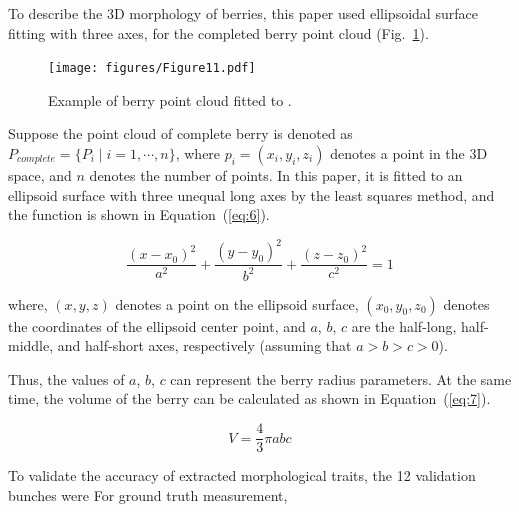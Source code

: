 \documentclass[12pt]{article}
\begin{document}
To describe the 3D morphology of berries, this paper used ellipsoidal surface fitting with three axes, for the completed berry point cloud (Fig.~\ref{fig:raw16}).

\begin{figure}[hbt!]
    \centering
    \texttt{[image: figures/Figure11.pdf]}
    \caption{Example of berry point cloud fitted to .}
    \label{fig:raw16}
\end{figure}


Suppose the point cloud of  complete berry is denoted as $P_{complete}=\{P_i \mid i=1, \cdots,n\}$, where $p_i=(x_i,y_i,z_i)$ denotes a point in the 3D space, and $n$ denotes the number of points. 
In this paper, it is fitted to an ellipsoid surface with three unequal long axes by the least squares method, and the function is shown in Equation~(\ref{eq:6}).

\begin{equation}
    \frac{(x-x_0)^2}{a^2} + \frac{(y-y_0)^2}{b^2} + \frac{(z-z_0)^2}{c^2} = 1
    \label{eq:6}
\end{equation}

{\raggedright where, $(x,y,z)$ denotes a point on the ellipsoid surface, $(x_0,y_0,z_0)$ denotes the coordinates of the ellipsoid center point, and $a$, $b$, $c$ are the half-long, half-middle, and half-short axes, respectively (assuming that $a>b>c>0$). }

Thus, the values of $a$, $b$, $c$ can represent the berry radius parameters. 
At the same time, the volume of the berry can be calculated as shown in Equation~(\ref{eq:7}).

\begin{equation}
    V=\frac{4}{3} \pi a b c
    \label{eq:7}
\end{equation}

To validate the accuracy of extracted morphological traits, the 12 validation bunches  were  
For ground truth measurement, 
\end{document}
